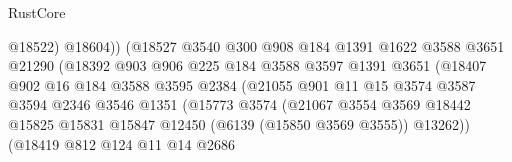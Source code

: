 \begin{lexlean}{RustCore}
\begin{coremodule}
                                        @18522)
                                      @18604))
                                  (@18527
                                    @3540
                                    @300
                                    @908
                                    @184
                                    @1391
                                    @1622
                                    @3588
                                    @3651
                                    @21290
                                    (@18392
                                      @903
                                      @906
                                      @225
                                      @184
                                      @3588
                                      @3597
                                      @1391
                                      @3651
                                      (@18407
                                        @902
                                        @16
                                        @184
                                        @3588
                                        @3595
                                        @2384
                                        (@21055
                                          @901
                                          @11
                                          @15
                                          @3574
                                          @3587
                                          @3594
                                          @2346
                                          @3546
                                          @1351
                                          (@15773
                                            @3574
                                            (@21067
                                              @3554
                                              @3569
                                              @18442
                                              @15825
                                              @15831
                                              @15847
                                              @12450
                                              (@6139 (@15850 @3569 @3555))
                                              @13262))
                                          (@18419
                                            @812
                                            @124
                                            @11
                                            @14
                                            @2686

\end{coremodule}
\end{lexlean}
